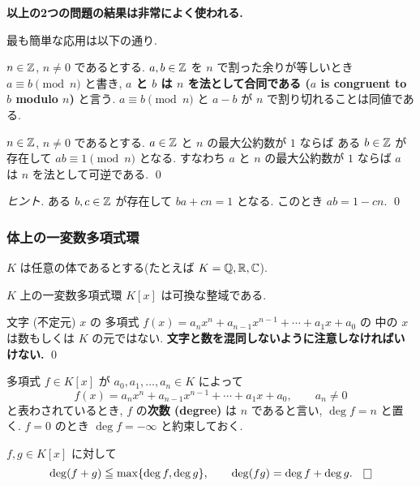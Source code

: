 \documentclass[12pt,twoside]{jarticle}
\begin{document}
\bigskip
{\Large\bf 以上の2つの問題の結果は非常によく使われる.}
\bigskip


最も簡単な応用は以下の通り.

$n\in{\mathbb Z}$, $n\ne 0$ であるとする.
$a,b\in{\mathbb Z}$ を $n$ で割った余りが等しいとき $a\equiv b\pmod{n}$ と書き, 
{\bf $a$ と $b$ は $n$ を法として合同である 
($a$ is congruent to $b$ modulo $n$)} と言う.
$a\equiv b\pmod{n}$ と $a-b$ が $n$ で割り切れることは同値である.

\begin{question}[5点]
 $n\in{\mathbb Z}$, $n\ne 0$ であるとする.
 $a\in {\mathbb Z}$ と $n$ の最大公約数が $1$ ならば
 ある $b\in{\mathbb Z}$ が存在して $ab\equiv 1\pmod{n}$ となる.
 すなわち $a$ と $n$ の最大公約数が $1$ ならば %
 $a$ は $n$ を法として可逆である.
 \qed
\end{question}

\begin{proof}[ヒント]
 ある $b,c\in{\mathbb Z}$ が存在して $ba+cn=1$ となる.
 このとき $ab = 1 - cn$. \qed
\end{proof}


\subsubsection{体上の一変数多項式環}

$K$ は任意の体であるとする(たとえば $K={\mathbb Q},{\mathbb R},{\mathbb C}$).

$K$ 上の一変数多項式環 $K[x]$ は可換な整域である.

\begin{rem}
 文字 (不定元) $x$ の
 多項式 $f(x) = a_n x^n + a_{n-1} x^{n-1} + \cdots + a_1 x + a_0$ の
 中の $x$ は数もしくは $K$ の元ではない.
 {\bf 文字と数を混同しないように注意しなければいけない.}
 \qed
\end{rem}

多項式 $f\in K[x]$ が $a_0,a_1,\ldots,a_n\in K$ によって
\begin{equation*}
 f(x) = a_n x^n + a_{n-1} x^{n-1} + \cdots + a_1 x + a_0, \qquad a_n\ne 0
\end{equation*}
と表わされているとき, $f$ の{\bf 次数 (degree)} は $n$ であると言い, 
$\deg f = n$ と置く. $f=0$ のとき $\deg f = -\infty$ と約束しておく.


\begin{question}[次数の基本性質]
 $f,g\in K[x]$ に対して
 \begin{equation*}
  \deg(f+g)\leqq \max\{\deg f,\deg g\}, \qquad
  \deg(fg) = \deg f + \deg g.
  \qed
 \end{equation*}
\end{question}
\end{document}
